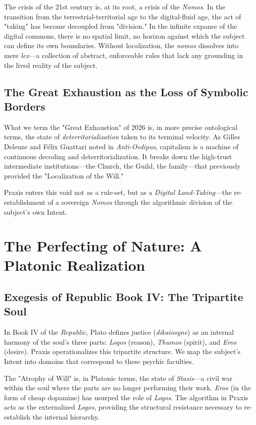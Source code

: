 \documentclass[12pt,a4paper,oneside]{report}
\begin{document}
The crisis of the 21st century is, at its root, a crisis of the \textit{Nomos}. In the transition from the terrestrial-territorial age to the digital-fluid age, the act of "taking" has become decoupled from "division." In the infinite expanse of the digital commons, there is no spatial limit, no horizon against which the subject can define its own boundaries. Without localization, the \textit{nomos} dissolves into mere \textit{lex}—a collection of abstract, enforceable rules that lack any grounding in the lived reality of the subject. 

\section{The Great Exhaustion as the Loss of Symbolic Borders}
What we term the "Great Exhaustion" of 2026 is, in more precise ontological terms, the state of \textit{deterritorialization} taken to its terminal velocity. As Gilles Deleuze and Félix Guattari noted in \textit{Anti-Oedipus}, capitalism is a machine of continuous decoding and deterritorialization. It breaks down the high-trust intermediate institutions—the Church, the Guild, the family—that previously provided the "Localization of the Will." 

Praxis enters this void not as a rule-set, but as a \textit{Digital Land-Taking}—the re-establishment of a sovereign \textit{Nomos} through the algorithmic division of the subject's own Intent.

\chapter{The Perfecting of Nature: A Platonic Realization}

\section{Exegesis of Republic Book IV: The Tripartite Soul}
In Book IV of the \textit{Republic}, Plato defines justice (\textit{dikaiosyne}) as an internal harmony of the soul’s three parts: \textit{Logos} (reason), \textit{Thumos} (spirit), and \textit{Eros} (desire). Praxis operationalizes this tripartite structure. We map the subject's Intent into domains that correspond to these psychic faculties.

The "Atrophy of Will" is, in Platonic terms, the state of \textit{Stasis}—a civil war within the soul where the parts are no longer performing their work. \textit{Eros} (in the form of cheap dopamine) has usurped the role of \textit{Logos}. The algorithm in Praxis acts as the externalized \textit{Logos}, providing the structural resistance necessary to re-establish the internal hierarchy.
\end{document}
